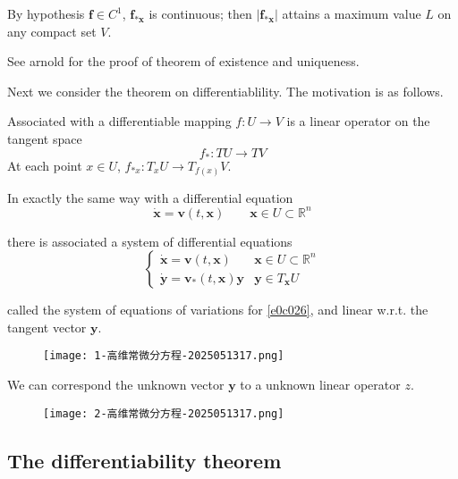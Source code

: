 \begin{remark}
By hypothesis $\boldsymbol{f}\in C^{1}$, $\boldsymbol{f}_{*\boldsymbol{x}}$ is continuous; then $\lvert \boldsymbol{f}_{*\boldsymbol{x}} \rvert$ attains a maximum value $L$ on any compact set $V$.
\end{remark}
See arnold for the proof of theorem of existence and uniqueness.

Next we consider the theorem on differentiablility. The motivation is as follows.

Associated with a differentiable mapping $f:U\to V$ is a linear operator on the tangent space
\[
f_{*}:TU\to TV
\]
At each point $x\in U$, $f_{*x}:T_{x}U\to T_{f(x)}V$.

In exactly the same way with a differential equation
\begin{equation}
\dot{\boldsymbol{x}}=\boldsymbol{v}(t,\boldsymbol{x})\qquad \boldsymbol{x}\in U\subset \mathbb{R}^{n}
\label{e0c026}
\end{equation}

there is associated a system of differential equations
\begin{equation}
\begin{cases}
\dot{\boldsymbol{x}}=\boldsymbol{v}(t,\boldsymbol{x}) & \boldsymbol{x}\in U\subset \mathbb{R}^{n} \\
\dot{\boldsymbol{y}}=\boldsymbol{v}_{*}(t,\boldsymbol{x})\boldsymbol{y} & \boldsymbol{y}\in T_{\boldsymbol{x}}U
\end{cases}
\label{90ff85}
\end{equation}

called the system of equations of variations for \cref{e0c026}, and linear w.r.t. the tangent vector $\boldsymbol{y}$.
\begin{figure}[H]
\centering
\texttt{[image: 1-高维常微分方程-2025051317.png]}
\label{}
\end{figure}

We can correspond the unknown vector $\boldsymbol{y}$ to a unknown linear operator $z$.

\begin{figure}[H]
\centering
\texttt{[image: 2-高维常微分方程-2025051317.png]}
\label{}
\end{figure}

\subsection{The differentiability theorem}

